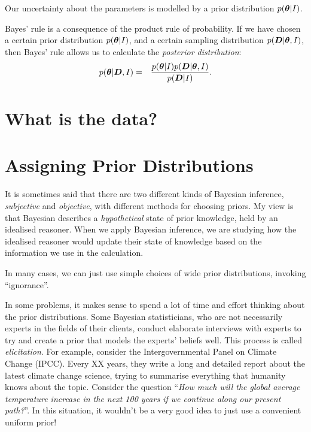 Our uncertainty about the parameters is modelled by a prior distribution
$p(\boldsymbol{\theta} | I)$.

Bayes' rule is a consequence of the product rule of probability. If we have
chosen a certain prior distribution $p(\boldsymbol{\theta} | I)$, and a certain sampling
distribution $p(\boldsymbol{D} | \boldsymbol{\theta}, I)$, then Bayes' rule allows us to calculate
the {\it posterior distribution}:
\begin{eqnarray}
p(\boldsymbol{\theta} | \boldsymbol{D}, I) &=& \frac{p(\boldsymbol{\theta} | I)p(\boldsymbol{D} | \boldsymbol{\theta}, I)}{p(\boldsymbol{D} | I)}.
\end{eqnarray}



\section{What is the data?}



\section{Assigning Prior Distributions}
It is sometimes said that there are two different kinds of Bayesian inference,
{\it subjective} and {\it objective}, with different methods for choosing
priors. My view is that Bayesian describes a {\it hypothetical}
state of prior knowledge, held by an idealised reasoner. When we apply
Bayesian inference, we are studying how the idealised reasoner would update
their state of knowledge based on the information we use in the calculation.

In many cases, we can just use simple choices of wide prior distributions,
invoking ``ignorance''.

In some problems, it makes sense to spend a lot of time and effort thinking
about the prior distributions. Some Bayesian statisticians, who are not
necessarily experts in the fields of their clients, conduct elaborate interviews
with experts to try and create a prior that models the experts' beliefs well.
This process is called {\it elicitation}.
For example, consider the Intergovernmental Panel on Climate Change (IPCC).
Every XX years, they write a long and detailed report about the latest climate
change science, trying to summarise everything that humanity knows about the
topic. Consider the question ``{\it How much will the global average temperature
increase in the next 100 years if we continue along our present path?}''.
In this situation, it wouldn't be a very good idea to just use a convenient
uniform prior!




